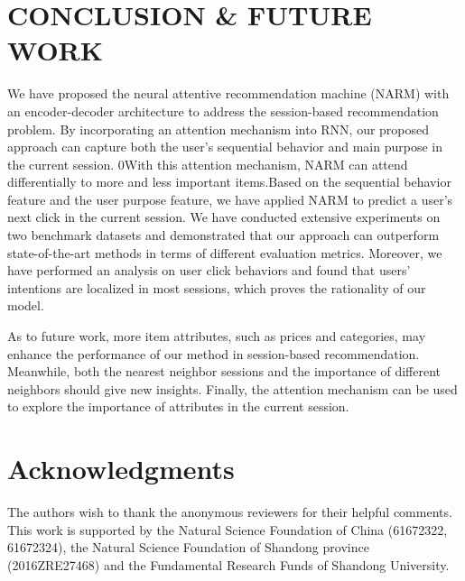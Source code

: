 \documentclass[sigconf]{acmart}
\begin{document}
\section{CONCLUSION \& FUTURE WORK}
We have proposed the neural attentive recommendation machine (NARM) with an encoder-decoder architecture to address the session-based recommendation problem. By incorporating an attention mechanism into RNN, our proposed approach can capture both the user's sequential behavior and main purpose in the current session. \if0With this attention mechanism, NARM can attend differentially to more and less important items.\fi Based on the sequential behavior feature and the user purpose feature, we have applied NARM to predict a user's next click in the current session. We have conducted extensive experiments on two benchmark datasets and demonstrated that our approach can outperform state-of-the-art methods in terms of different evaluation metrics. Moreover, we have performed an analysis on user click behaviors and found that users' intentions are localized in most sessions, which proves the rationality of our model.

As to future work, more item attributes, such as prices and categories, may enhance the performance of our method in session-based recommendation. Meanwhile, both the nearest neighbor sessions and the importance of different neighbors  should give new insights. Finally, the attention mechanism can be used to explore the importance of attributes in the current session. 


\section*{Acknowledgments}
The authors wish to thank the anonymous reviewers for their helpful comments. This work is supported by the Natural Science Foundation of China (61672322, 61672324), the Natural Science Foundation of Shandong province (2016ZRE27468) and the Fundamental Research Funds of Shandong University.


 
\end{document}
